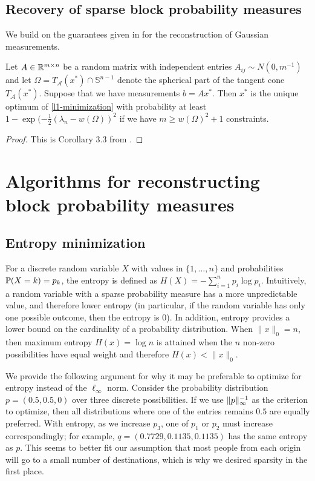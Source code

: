 \documentclass{article} %
\begin{document}

\subsection{Recovery of sparse block probability measures}
We build on the guarantees given in \cite{inverse_problems} for the reconstruction of Gaussian measurements.
\begin{theorem}
  Let $A\in \R^{m\times n}$ be a random matrix with independent
  entries $A_{ij}\sim N(0, m^{-1})$ and let $\Omega = T_{\mathcal
    A}(x^*)\cap \mathbb{S}^{n-1}$ denote the spherical part of the
  tangent cone $T_{\mathcal A}(x^*)$. Suppose that we have
  measurements $b = Ax^*$. Then $x^*$ is the unique optimum of
  \eqref{l1-minimization} with probability at least $1 - \exp(-\frac 1
  2 (\lambda_n - w(\Omega))^2$ if we have $m\geq w(\Omega)^2 + 1$
  constraints.
\end{theorem}
\begin{proof}
  This is Corollary 3.3 from \cite{inverse_problems}.
\end{proof}


\section{Algorithms for reconstructing block probability measures}
\subsection{Entropy minimization}
For a discrete random variable $X$ with values in $\{1, \dots, n\}$ and probabilities $\P(X = k) = p_k$, the entropy is defined as $H(X)  = -\sum_{i=1}^{n} p_i \log p_i$.
Intuitively, a random variable with a sparse probability measure has a more unpredictable value, and therefore lower entropy (in particular, if the random variable has only one possible outcome, then the entropy is 0).
In addition, entropy provides a lower bound on the cardinality of a probability distribution. When $\|x\|_0 = n$, then maximum entropy $H(x) = \log n$ is attained when the $n$ non-zero possibilities have equal weight and therefore $H(x) < \|x\|_0$.

We provide the following argument for why it may be preferable to optimize for entropy instead of the $\ell_\infty$ norm.
Consider the probability distribution $p = (0.5, 0.5, 0)$ over three discrete possibilities.
If we use $\norm{p}_{\infty}^{-1}$ as the criterion to optimize, then all distributions where one of the entries remains $0.5$ are equally preferred.
With entropy, as we increase $p_3$, one of $p_1$ or $p_2$ must increase correspondingly; for example, $q = (0.7729, 0.1135, 0.1135)$ has the same entropy as $p$.
This seems to better fit our assumption that most people from each origin will go to a small number of destinations, which is why we desired sparsity in the first place.
\end{document}
